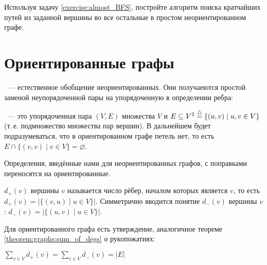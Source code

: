 \begin{Exercise}[counter=SecExercise]
    \noindent
    Используя задачу \ref{exercise:almost_BFS}, постройте алгоритм поиска кратчайших путей из заданной вершины во все остальные в простом неориентированном графе.
\end{Exercise}



\newpage



\section{Ориентированные графы}
\label{sec:oriented_graphs}

~--- естественное обобщение неориентированных.
Они получаеются простой заменой неупорядоченной пары на упорядоченную в определении ребра:
\begin{definition}
    ~--- это упорядоченная пара $ (V, E) $ множества  $ V $
    и  $ E \subseteq V^2 \overset{\triangle}{=} \{ (u, v) \mid u, v \in V \} $ (т.\,е. подмножество множества пар вершин).
    В дальнейшем будет подразумеваться, что в ориентированном графе петель нет, то есть $ E \cap \{(v, v) \mid v \in V \} = \varnothing $.
\end{definition}

Определения, введённые нами для неориентированных графов, с поправками переносятся на ориентированные.

\begin{definition}
     $ d_+(v) $ вершины $ v $ называется число рёбер, началом которых является $ v $,
    то есть $ d_+(v) = |\{ (v, u) \mid u \in V \}| $.
    Симметрично вводится понятие  $ d_-(v) $ вершины $ v $: $ d_-(v) = |\{ (u, v) \mid u \in V \}| $.
\end{definition}

Для ориентированного графа есть утверждение, аналогичное теореме \ref{theorem:graphs:sum_of_degs} о рукопожатиях:

\begin{statement}
    $ \displaystyle \sum_{v \in V} d_+(v) = \sum_{v \in V} d_-(v) = |E| $
\end{statement}

